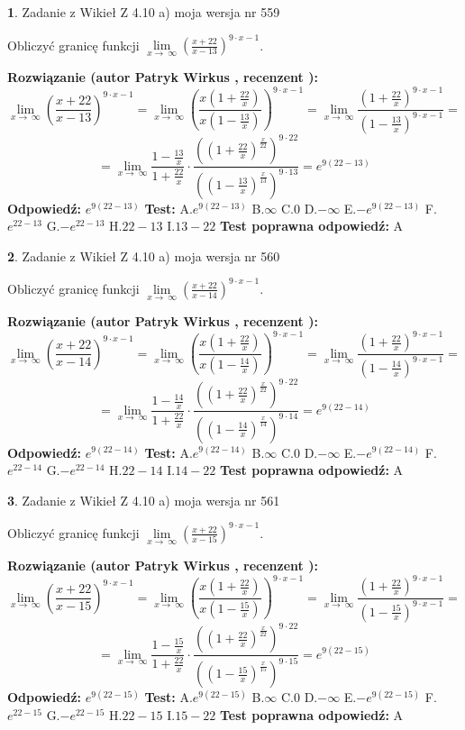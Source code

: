 \documentclass[12pt, a4paper]{article}
\theoremstyle{definition} %
\newtheorem{zad}{}
\newcommand{\zadStart}[1]{\begin{zad}#1\newline}
\newcommand{\zadStop}{\end{zad}}
\newcommand{\rozwStart}[2]{\noindent \textbf{Rozwiązanie (autor #1 , recenzent #2): }\newline}
\newcommand{\rozwStop}{\newline}
\newcommand{\odpStart}{\noindent \textbf{Odpowiedź:}\newline}
\newcommand{\odpStop}{\newline}
\newcommand{\testStart}{\noindent \textbf{Test:}\newline}
\newcommand{\testStop}{\newline}
\newcommand{\kluczStart}{\noindent \textbf{Test poprawna odpowiedź:}\newline}
\newcommand{\kluczStop}{\newline}
\begin{document}
\zadStart{Zadanie z Wikieł Z 4.10 a) moja wersja nr 559}


Obliczyć granicę funkcji  $\lim\limits_{x\to\ \infty}(\frac{x+22}{x-13})^{9\cdot x-1}$.
\zadStop
\rozwStart{Patryk Wirkus}{}
$$\lim\limits_{x\to\ \infty}(\frac{x+22}{x-13})^{9\cdot x-1} = \lim\limits_{x\to\ \infty}(\frac{x(1+\frac{22}{x})}{x(1-\frac{13}{x})})^{9\cdot x-1}=\lim\limits_{x\to\ \infty}\frac{(1+\frac{22}{x})^{9\cdot x-1}}{(1-\frac{13}{x})^{9\cdot x-1}}=$$
$$=\lim\limits_{x\to\ \infty}\frac{1-\frac{13}{x}}{1+\frac{22}{x}}\cdot\frac{((1+\frac{22}{x})^{\frac{x}{22}})^{9\cdot22}}{((1-\frac{13}{x})^{\frac{x}{13}})^{9\cdot13}}=e^{9(22-13)}$$
\rozwStop
\odpStart
$e^{9(22-13)}$
\odpStop
\testStart
A.$e^{9(22-13)}$ B.$\infty$ C.$0$ D.$-\infty$ E.$-e^{9(22-13)}$
F.$e^{22-13}$ G.$-e^{22-13}$
H.$22-13$
I.$13-22$
\testStop
\kluczStart
A
\kluczStop



\zadStart{Zadanie z Wikieł Z 4.10 a) moja wersja nr 560}


Obliczyć granicę funkcji  $\lim\limits_{x\to\ \infty}(\frac{x+22}{x-14})^{9\cdot x-1}$.
\zadStop
\rozwStart{Patryk Wirkus}{}
$$\lim\limits_{x\to\ \infty}(\frac{x+22}{x-14})^{9\cdot x-1} = \lim\limits_{x\to\ \infty}(\frac{x(1+\frac{22}{x})}{x(1-\frac{14}{x})})^{9\cdot x-1}=\lim\limits_{x\to\ \infty}\frac{(1+\frac{22}{x})^{9\cdot x-1}}{(1-\frac{14}{x})^{9\cdot x-1}}=$$
$$=\lim\limits_{x\to\ \infty}\frac{1-\frac{14}{x}}{1+\frac{22}{x}}\cdot\frac{((1+\frac{22}{x})^{\frac{x}{22}})^{9\cdot22}}{((1-\frac{14}{x})^{\frac{x}{14}})^{9\cdot14}}=e^{9(22-14)}$$
\rozwStop
\odpStart
$e^{9(22-14)}$
\odpStop
\testStart
A.$e^{9(22-14)}$ B.$\infty$ C.$0$ D.$-\infty$ E.$-e^{9(22-14)}$
F.$e^{22-14}$ G.$-e^{22-14}$
H.$22-14$
I.$14-22$
\testStop
\kluczStart
A
\kluczStop



\zadStart{Zadanie z Wikieł Z 4.10 a) moja wersja nr 561}


Obliczyć granicę funkcji  $\lim\limits_{x\to\ \infty}(\frac{x+22}{x-15})^{9\cdot x-1}$.
\zadStop
\rozwStart{Patryk Wirkus}{}
$$\lim\limits_{x\to\ \infty}(\frac{x+22}{x-15})^{9\cdot x-1} = \lim\limits_{x\to\ \infty}(\frac{x(1+\frac{22}{x})}{x(1-\frac{15}{x})})^{9\cdot x-1}=\lim\limits_{x\to\ \infty}\frac{(1+\frac{22}{x})^{9\cdot x-1}}{(1-\frac{15}{x})^{9\cdot x-1}}=$$
$$=\lim\limits_{x\to\ \infty}\frac{1-\frac{15}{x}}{1+\frac{22}{x}}\cdot\frac{((1+\frac{22}{x})^{\frac{x}{22}})^{9\cdot22}}{((1-\frac{15}{x})^{\frac{x}{15}})^{9\cdot15}}=e^{9(22-15)}$$
\rozwStop
\odpStart
$e^{9(22-15)}$
\odpStop
\testStart
A.$e^{9(22-15)}$ B.$\infty$ C.$0$ D.$-\infty$ E.$-e^{9(22-15)}$
F.$e^{22-15}$ G.$-e^{22-15}$
H.$22-15$
I.$15-22$
\testStop
\kluczStart
A
\kluczStop
\end{document}
